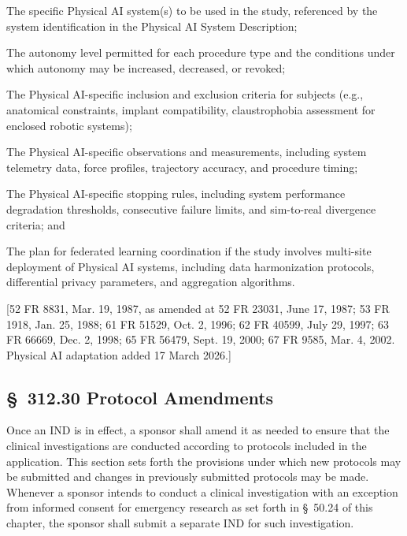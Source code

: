 \begin{description}[leftmargin=0.8cm,style=sameline]
\item[(i)] The specific Physical AI system(s) to be used in the study, referenced by the system identification in the Physical AI System Description;
\item[(ii)] The autonomy level permitted for each procedure type and the conditions under which autonomy may be increased, decreased, or revoked;
\item[(iii)] The Physical AI-specific inclusion and exclusion criteria for subjects (e.g., anatomical constraints, implant compatibility, claustrophobia assessment for enclosed robotic systems);
\item[(iv)] The Physical AI-specific observations and measurements, including system telemetry data, force profiles, trajectory accuracy, and procedure timing;
\item[(v)] The Physical AI-specific stopping rules, including system performance degradation thresholds, consecutive failure limits, and sim-to-real divergence criteria; and
\item[(vi)] The plan for federated learning coordination if the study involves multi-site deployment of Physical AI systems, including data harmonization protocols, differential privacy parameters, and aggregation algorithms.
\end{description}

[52 FR 8831, Mar. 19, 1987, as amended at 52 FR 23031, June 17, 1987; 53 FR 1918, Jan. 25, 1988; 61 FR 51529, Oct. 2, 1996; 62 FR 40599, July 29, 1997; 63 FR 66669, Dec. 2, 1998; 65 FR 56479, Sept. 19, 2000; 67 FR 9585, Mar. 4, 2002. Physical AI adaptation added 17 March 2026.]

\subsection{\S~312.30 Protocol Amendments}

Once an IND is in effect, a sponsor shall amend it as needed to ensure that the clinical investigations are conducted according to protocols included in the application. This section sets forth the provisions under which new protocols may be submitted and changes in previously submitted protocols may be made. Whenever a sponsor intends to conduct a clinical investigation with an exception from informed consent for emergency research as set forth in \S~50.24 of this chapter, the sponsor shall submit a separate IND for such investigation.


